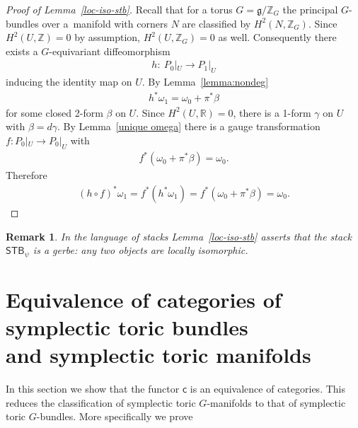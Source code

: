 \documentclass[10pt,a4paper]{amsart}
\numberwithin{equation}{section}
\newtheorem{Remark}[Lemma]{Remark}
\begin{document}
\begin{proof}[Proof of Lemma~\ref{loc-iso-stb}]\sloppy
Recall that for a torus $G= {\mathfrak g}/{\mathbb Z}_G$ the principal $G$-bundles
over a~mani\-fold with corners $N$  are classif\/ied by $H^2(N,{\mathbb Z}_G)$.
Since $H^2(U, {\mathbb Z}) = 0$ by assumption, $H^2(U,{\mathbb Z}_G) = 0$ as well.
  Consequently there exists a $G$-equivariant dif\/feomorphism
\begin{gather*}
h\colon \  P_0|_U \to P_1|_U
\end{gather*}
inducing the identity map on $U$.  By Lemma~\ref{lemma:nondeg}
\begin{gather*}
h^*\omega_1 = \omega_0 + \pi^*\beta
\end{gather*}
for some closed 2-form $\beta$ on $U$.  Since $H^2 (U, {\mathbb R}) =0$, there is a 1-form $\gamma$ on $U$ with $\beta = d \gamma$.  By Lemma~\ref{unique omega} there is a gauge transformation $f\colon  P_0|_U \to P_0|_U$ with
\begin{gather*}
f^* (\omega_0 + \pi^*\beta) = \omega_0.
\end{gather*}
Therefore
\begin{gather*}
(h\circ f)^* \omega_1 = f^* (h^*\omega_1) = f^* (\omega_0 +
\pi^*\beta) = \omega_0.\tag*{\qed}
\end{gather*}
\renewcommand{\qed}{}
\end{proof}

\begin{Remark}
  In the language of stacks Lemma~\ref{loc-iso-stb} asserts that the
  stack ${\textsf{STB}}_\psi$ is a gerbe: any two objects are locally
  isomorphic.
\end{Remark}

\section{Equivalence of categories of symplectic toric bundles\\
and symplectic toric manifolds}
\label{sec:equiv of cat}

In this section we show that the functor ${\textsf{c}}$
is an equivalence of categories.
This reduces the classif\/ication of symplectic toric $G$-manifolds
to that of symplectic toric $G$-bundles.  More specif\/ically we prove
\end{document}
